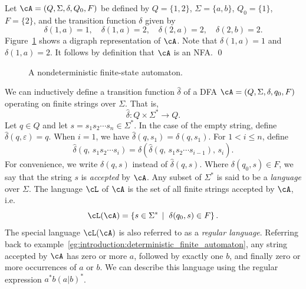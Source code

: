 \begin{example}
\rm
Let $\cA = (Q, \Sigma, \delta, Q_0, F)$ be defined by
$Q = \{1, 2\}$, $\Sigma = \{a, b\}$, $Q_0 = \{1\}$,
$F = \{2\}$, and the transition function $\delta$ given by
\[
\delta(1,a) = 1,\quad
\delta(1,a) = 2,\quad
\delta(2,a) = 2,\quad
\delta(2,b) = 2.
\]
Figure~\ref{fig:introduction:nondeterministic_finite_state_automaton}
shows a digraph representation of $\cA$. Note that $\delta(1,a) = 1$
and $\delta(1,a) = 2$. It follows by definition that $\cA$ is an
NFA. \qed
\end{example}

\begin{figure}[!htbp]
\centering
{}

\caption{A nondeterministic finite-state automaton.}
\label{fig:introduction:nondeterministic_finite_state_automaton}
\end{figure}

We can inductively define a transition function $\hat{\delta}$ of a
DFA $\cA = (Q, \Sigma, \delta, q_0, F)$ operating on finite strings
over $\Sigma$. That is,
\begin{equation}
\hat{\delta} : Q \times \Sigma^\ast \to Q.
\end{equation}
Let $q \in Q$ and let $s = s_1 s_2 \cdots s_n \in \Sigma^\ast$. In the
case of the empty string, define
$\hat{\delta} (q, \varepsilon) = q$. When $i = 1$, we have
$\hat{\delta}(q, s_1) = \delta(q, s_1)$. For $1 < i \leq n$, define
\[
\hat{\delta}(q,\, s_1 s_2 \cdots s_i)
=
\hat{\delta}
\left(
  \hat{\delta}(q,\, s_1 s_2 \cdots s_{i-1}),\, s_i
\right).
\]
For convenience, we write $\delta(q,s)$ instead of
$\hat{\delta}(q,s)$. Where $\delta(q_0,s) \in F$, we say that the
string $s$ is \emph{accepted} by $\cA$. Any
subset of $\Sigma^\ast$ is said to be a
\emph{language} over $\Sigma$. The language $\cL$ of
$\cA$ is the set of all finite strings accepted by $\cA$,
i.e.
\[
\cL(\cA)
=
\left\{
  s \in \Sigma^\ast \;\left|\right.\; \delta(q_0,s) \in F
\right\}.
\]
The special language $\cL(\cA)$ is also referred to as a
\emph{regular language}. Referring back to
example~\ref{eg:introduction:deterministic_finite_automaton}, any
string accepted by $\cA$ has zero or more $a$, followed by exactly
one $b$, and finally zero or more occurrences of $a$ or $b$. We can
describe this language using the regular
expression $a^\ast b (a|b)^\ast$.

